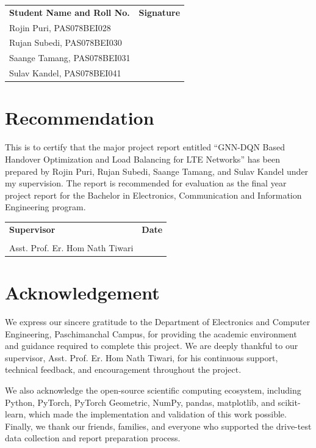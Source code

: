 \documentclass[12pt,a4paper]{report}
\newcommand{\projecttitle}{GNN-DQN Based Handover Optimization and Load Balancing for LTE Networks}
\begin{document}
\vspace{1.0cm}
\begin{tabularx}{\textwidth}{Y Y}
\textbf{Student Name and Roll No.} & \textbf{Signature}\\[0.4cm]
Rojin Puri, PAS078BEI028 & \hrulefill\\[0.5cm]
Rujan Subedi, PAS078BEI030 & \hrulefill\\[0.5cm]
Saange Tamang, PAS078BEI031 & \hrulefill\\[0.5cm]
Sulav Kandel, PAS078BEI041 & \hrulefill\\
\end{tabularx}

\chapter*{Recommendation}
This is to certify that the major project report entitled ``\projecttitle'' has been prepared by Rojin Puri, Rujan Subedi, Saange Tamang, and Sulav Kandel under my supervision. The report is recommended for evaluation as the final year project report for the Bachelor in Electronics, Communication and Information Engineering program.

\vspace{1.5cm}
\begin{tabularx}{\textwidth}{Y Y}
\textbf{Supervisor} & \textbf{Date}\\[0.7cm]
\hrulefill & \hrulefill\\
Asst. Prof. Er. Hom Nath Tiwari & \\
\end{tabularx}

\chapter*{Acknowledgement}
We express our sincere gratitude to the Department of Electronics and Computer Engineering, Paschimanchal Campus, for providing the academic environment and guidance required to complete this project. We are deeply thankful to our supervisor, Asst. Prof. Er. Hom Nath Tiwari, for his continuous support, technical feedback, and encouragement throughout the project.

We also acknowledge the open-source scientific computing ecosystem, including Python, PyTorch, PyTorch Geometric, NumPy, pandas, matplotlib, and scikit-learn, which made the implementation and validation of this work possible. Finally, we thank our friends, families, and everyone who supported the drive-test data collection and report preparation process.
\end{document}
